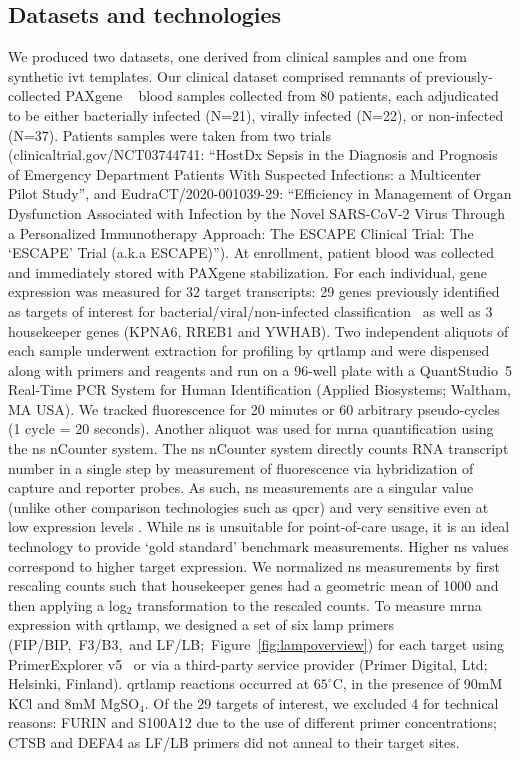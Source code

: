 \documentclass[../thesis.tex]{subfiles}
\begin{document}
\subsection{Datasets and technologies \label{sec:data}}
We produced two datasets, one derived from clinical samples and one from synthetic \gls{ivt}  templates. Our clinical dataset comprised remnants of previously-collected PAXgene ~\citep{ram-mohan_using_2022} blood samples collected from 80 patients, each adjudicated to be either bacterially infected (N=21), virally infected (N=22), or non-infected (N=37). 
Patients samples were taken from two trials (clinicaltrial.gov/NCT03744741: ``HostDx Sepsis in the Diagnosis and Prognosis of Emergency Department Patients With Suspected Infections: a Multicenter Pilot Study'', and EudraCT/2020-001039-29: ``Efficiency in Management of Organ Dysfunction Associated with Infection by the Novel SARS-CoV-2 Virus Through a Personalized Immunotherapy Approach: The ESCAPE Clinical Trial: The `ESCAPE' Trial (a.k.a ESCAPE)'').
At enrollment, patient blood was collected and immediately stored with PAXgene  stabilization. For each individual, gene expression was measured for 32 target  transcripts: 29 genes previously identified as targets of interest for bacterial/viral/non-infected classification~\citep{he_optimization_2021} as well as 3 housekeeper genes (KPNA6, RREB1 and YWHAB). Two independent aliquots of each sample underwent  extraction for profiling by \gls{qrtlamp} and were dispensed along with primers and reagents and run on a 96-well plate with a QuantStudio\texttrademark~5 Real-Time PCR System for Human Identification (Applied Biosystems; Waltham, MA USA). We tracked fluorescence for 20 minutes or 60 arbitrary pseudo-cycles (1 cycle = 20 seconds). Another aliquot was used for \gls{mrna} quantification using the \gls{ns} nCounter system. The \gls{ns} nCounter system  directly counts RNA transcript number in a single step by measurement of fluorescence via hybridization of capture and reporter probes. As such, \gls{ns} measurements are a singular value (unlike other comparison technologies such as \gls{qpcr}) and very sensitive even at low expression levels \citep{geiss_direct_2008}. While \gls{ns} is unsuitable for point-of-care usage, it is an ideal technology to provide `gold standard' benchmark measurements. Higher \gls{ns} values correspond to higher target expression. We normalized \gls{ns} measurements by first rescaling counts such that housekeeper genes had a geometric mean of 1000 and then applying a \textsf{log}$_{2}$ transformation to the rescaled counts. To measure \gls{mrna} expression with \gls{qrtlamp}, we designed a set of six \gls{lamp} primers (FIP/BIP,~F3/B3,~and  LF/LB;~Figure~\ref{fig:lampoverview}) for each target using PrimerExplorer v5~\citep{eiken_primerexplorer_2019} or via a third-party service provider (Primer Digital, Ltd; Helsinki, Finland). \Gls{qrtlamp} reactions occurred at $65^{\circ}$C, in the presence of 90mM KCl and 8mM MgSO$_4$. Of the 29 targets of interest, we excluded 4 for technical reasons: {FURIN} and {S100A12} due to the use of different primer concentrations; {CTSB} and {DEFA4} as LF/LB primers did not anneal to their target sites.
\end{document}
